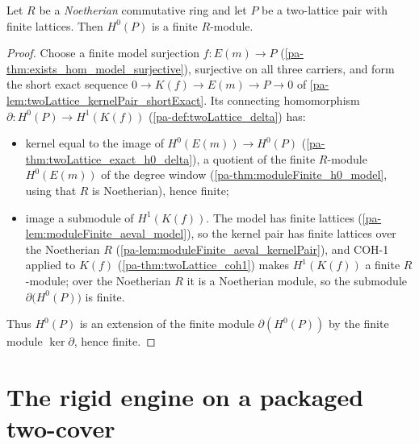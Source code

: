 \begin{theorem}
  \label{pa-thm:twoLattice_coh0}
  \leanok

  Let \(R\) be a \emph{Noetherian} commutative ring and let \(P\) be a two-lattice
  pair with finite lattices. Then \(H^0(P)\) is a finite \(R\)-module.
\end{theorem}
\begin{proof}
  \leanok
  Choose a finite model surjection \(f : E(m) \to P\)
  (\ref{pa-thm:exists_hom_model_surjective}), surjective on all three carriers, and form
  the short exact sequence \(0 \to K(f) \to E(m) \to P \to 0\) of
  \ref{pa-lem:twoLattice_kernelPair_shortExact}. Its connecting homomorphism
  \(\partial : H^0(P) \to H^1(K(f))\) (\ref{pa-def:twoLattice_delta}) has:
  \begin{itemize}
    \item kernel equal to the image of \(H^0(E(m)) \to H^0(P)\)
      (\ref{pa-thm:twoLattice_exact_h0_delta}), a quotient of the finite \(R\)-module
      \(H^0(E(m))\) of the degree window (\ref{pa-thm:moduleFinite_h0_model}, using that
      \(R\) is Noetherian), hence finite;
    \item image a submodule of \(H^1(K(f))\). The model has finite lattices
      (\ref{pa-lem:moduleFinite_aeval_model}), so the kernel pair has finite lattices
      over the Noetherian \(R\) (\ref{pa-lem:moduleFinite_aeval_kernelPair}), and COH-1
      applied to \(K(f)\) (\ref{pa-thm:twoLattice_coh1}) makes \(H^1(K(f))\) a finite
      \(R\)-module; over the Noetherian \(R\) it is a Noetherian module, so the
      submodule \(\partial\bigl(H^0(P)\bigr)\) is finite.
  \end{itemize}
  Thus \(H^0(P)\) is an extension of the finite module \(\partial(H^0(P))\) by the
  finite module \(\ker \partial\), hence finite.
\end{proof}

\section{The rigid engine on a packaged two-cover}
\label{pa-sec:rigid_engine_assembly}

